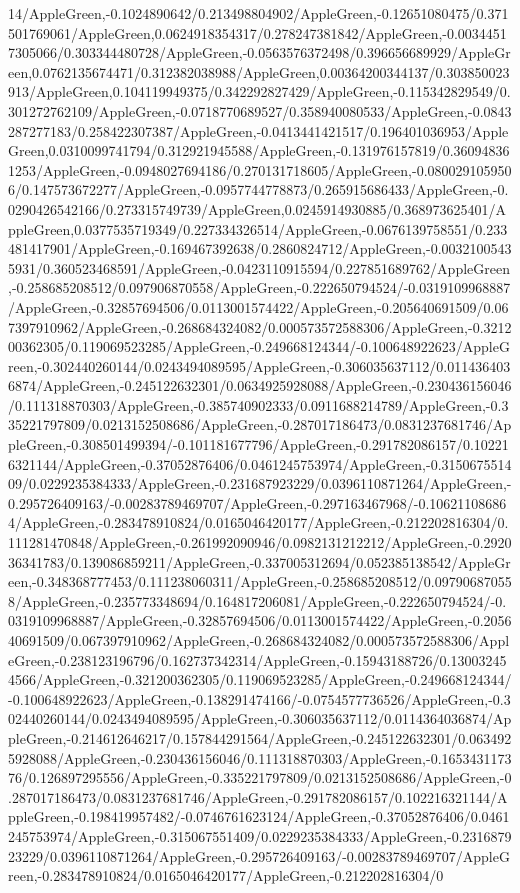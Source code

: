 {\begin{tikzternal}
{14/AppleGreen,-0.1024890642/0.213498804902/AppleGreen,-0.12651080475/0.371501769061/AppleGreen,0.0624918354317/0.278247381842/AppleGreen,-0.00344517305066/0.303344480728/AppleGreen,-0.0563576372498/0.396656689929/AppleGreen,0.0762135674471/0.312382038988/AppleGreen,0.00364200344137/0.303850023913/AppleGreen,0.104119949375/0.342292827429/AppleGreen,-0.115342829549/0.301272762109/AppleGreen,-0.0718770689527/0.358940080533/AppleGreen,-0.0843287277183/0.258422307387/AppleGreen,-0.0413441421517/0.196401036953/AppleGreen,0.0310099741794/0.312921945588/AppleGreen,-0.131976157819/0.360948361253/AppleGreen,-0.0948027694186/0.270131718605/AppleGreen,-0.0800291059506/0.147573672277/AppleGreen,-0.0957744778873/0.265915686433/AppleGreen,-0.0290426542166/0.273315749739/AppleGreen,0.0245914930885/0.368973625401/AppleGreen,0.0377535719349/0.227334326514/AppleGreen,-0.0676139758551/0.233481417901/AppleGreen,-0.169467392638/0.2860824712/AppleGreen,-0.00321005435931/0.360523468591/AppleGreen,-0.0423110915594/0.227851689762/AppleGreen,-0.258685208512/0.097906870558/AppleGreen,-0.222650794524/-0.0319109968887/AppleGreen,-0.32857694506/0.0113001574422/AppleGreen,-0.205640691509/0.067397910962/AppleGreen,-0.268684324082/0.000573572588306/AppleGreen,-0.321200362305/0.119069523285/AppleGreen,-0.249668124344/-0.100648922623/AppleGreen,-0.302440260144/0.0243494089595/AppleGreen,-0.306035637112/0.0114364036874/AppleGreen,-0.245122632301/0.0634925928088/AppleGreen,-0.230436156046/0.111318870303/AppleGreen,-0.385740902333/0.0911688214789/AppleGreen,-0.335221797809/0.0213152508686/AppleGreen,-0.287017186473/0.0831237681746/AppleGreen,-0.308501499394/-0.101181677796/AppleGreen,-0.291782086157/0.102216321144/AppleGreen,-0.37052876406/0.0461245753974/AppleGreen,-0.315067551409/0.0229235384333/AppleGreen,-0.231687923229/0.0396110871264/AppleGreen,-0.295726409163/-0.00283789469707/AppleGreen,-0.297163467968/-0.106211086864/AppleGreen,-0.283478910824/0.0165046420177/AppleGreen,-0.212202816304/0.111281470848/AppleGreen,-0.261992090946/0.0982131212212/AppleGreen,-0.292036341783/0.139086859211/AppleGreen,-0.337005312694/0.052385138542/AppleGreen,-0.348368777453/0.111238060311/AppleGreen,-0.258685208512/0.097906870558/AppleGreen,-0.235773348694/0.164817206081/AppleGreen,-0.222650794524/-0.0319109968887/AppleGreen,-0.32857694506/0.0113001574422/AppleGreen,-0.205640691509/0.067397910962/AppleGreen,-0.268684324082/0.000573572588306/AppleGreen,-0.238123196796/0.162737342314/AppleGreen,-0.15943188726/0.130032454566/AppleGreen,-0.321200362305/0.119069523285/AppleGreen,-0.249668124344/-0.100648922623/AppleGreen,-0.138291474166/-0.0754577736526/AppleGreen,-0.302440260144/0.0243494089595/AppleGreen,-0.306035637112/0.0114364036874/AppleGreen,-0.214612646217/0.157844291564/AppleGreen,-0.245122632301/0.0634925928088/AppleGreen,-0.230436156046/0.111318870303/AppleGreen,-0.165343117376/0.126897295556/AppleGreen,-0.335221797809/0.0213152508686/AppleGreen,-0.287017186473/0.0831237681746/AppleGreen,-0.291782086157/0.102216321144/AppleGreen,-0.198419957482/-0.0746761623124/AppleGreen,-0.37052876406/0.0461245753974/AppleGreen,-0.315067551409/0.0229235384333/AppleGreen,-0.231687923229/0.0396110871264/AppleGreen,-0.295726409163/-0.00283789469707/AppleGreen,-0.283478910824/0.0165046420177/AppleGreen,-0.212202816304/0}
\end{tikzternal}}
